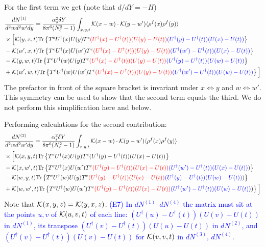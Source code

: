 \documentclass[aps,prd,amsmath,amssymb,nofootinbib]{revtex4-2}
\numberwithin{equation}{section}
\begin{document}
For the first term we get (note that $d/dY = - H$)
\begin{align}
    &\frac{dN^{(1)}}{d^2 w d^2 w' d y} = \frac{\alpha_s^2 \delta Y}{8 \pi^6 (N_c^2-1)}
\int_{x,y,t} {\cal K}(x-w)\cdot {\cal K}(y-w') \langle\rho^f(x) \rho^f(y) \rangle \notag \\ & \times  
\Big[ 
 {\cal K}(y,x,t) {\rm Tr} \left\{ T^e U^\dagger(x) U(y) T^e \textcolor{red}{( U^\dagger(x) - U^\dagger(t) )  ( U(y) - U(t) )}\textcolor{blue}{( U^\dagger(y) - U^\dagger(t) )  ( U(x) - U(t) )}\right\}
 \notag \\ & -  {\cal K}(w',x,t) {\rm Tr} \left\{ T^e U^\dagger(x) U(w') T^e \textcolor{red}{( U^\dagger(x) - U^\dagger(t) )  ( U(y) - U(t) )}\textcolor{blue}{( U^\dagger(w') - U^\dagger(t) )  ( U(x) - U(t) )}\right\}
 \notag \\ & -  {\cal K}(y,w,t) {\rm Tr} \left\{ T^e U^\dagger(w) U(y) T^e \textcolor{red}{( U^\dagger(x) - U^\dagger(t) )  ( U(y) - U(t) )}\textcolor{blue}{( U^\dagger(y) - U^\dagger(t) )  ( U(w) - U(t) )}\right\}
 \notag \\ & +  {\cal K}(w',w,t) {\rm Tr} \left\{ T^e U^\dagger(w) U(w') T^e \textcolor{red}{( U^\dagger(x) - U^\dagger(t) )  ( U(y) - U(t) )}\textcolor{blue}{( U^\dagger(w') - U^\dagger(t) )  ( U(w) - U(t) )}\right\}
\Big] 
\end{align}
The prefactor in front of the square bracket is invariant under $ x \Leftrightarrow y $ and $ w \Leftrightarrow w' $.  This symmetry can be used to show that the second term equals the third. We do not perform this simplification here and below. 

Performing calculations for the second contribution: 
\begin{align}
    &\frac{dN^{(2)}}{d^2 w d^2 w' d y} = \frac{\alpha_s^2 \delta Y}{8 \pi^6 (N_c^2-1)}
\int_{x,y,t} {\cal K}(x-w)\cdot {\cal K}(y-w') \langle\rho^f(x) \rho^f(y) \rangle \notag \\ & \times  
\Big[ 
 {\cal K}(x,y,t) {\rm Tr} \left\{ T^e U^\dagger(x) U(y) T^e ( U^\dagger(y) - U^\dagger(t) )  ( U(x) - U(t) )\right\}
 \notag \\ & -  {\cal K}(x, w',t) {\rm Tr} \left\{ T^e U^\dagger(x) U(w') T^e \textcolor{red}{( U^\dagger(y) - U^\dagger(t) )  ( U(x) - U(t) )}\textcolor{blue}{( U^\dagger(w') - U^\dagger(t) )  ( U(x) - U(t) )})\right\}
 \notag \\ & -  {\cal K}(w,y,t) {\rm Tr} \left\{ T^e U^\dagger(w) U(y) T^e \textcolor{red}{( U^\dagger(y) - U^\dagger(t) )  ( U(x) - U(t) )}\textcolor{blue}{( U^\dagger(y) - U^\dagger(t) )  ( U(w) - U(t) )} )\right\}
 \notag \\ & +  {\cal K}(w, w',t) {\rm Tr} \left\{ T^e U^\dagger(w) U(w') T^e \textcolor{red}{( U^\dagger(y) - U^\dagger(t) )  ( U(x) - U(t) )}\textcolor{blue}{( U^\dagger(w') - U^\dagger(t) )  ( U(w) - U(t) )} )\right\}
\Big] 
\end{align} 
Note that ${\cal K}(x,y,z) = {\cal K}(y,x,z)$. \textcolor{blue}{(E7) In $dN^{(1)}$--$dN^{(4)}$ the matrix must sit at the points $u,v$ of ${\cal K}(u,v,t)$ of each line: $(U^\dagger(u)-U^\dagger(t))(U(v)-U(t))$ in $dN^{(1)}$, its transpose $(U^\dagger(v)-U^\dagger(t))(U(u)-U(t))$ in $dN^{(2)}$, and $(U^\dagger(v)-U^\dagger(t))(U(v)-U(t))$ for ${\cal K}(v,v,t)$ in $dN^{(3)}$, $dN^{(4)}$.} 
\end{document}
